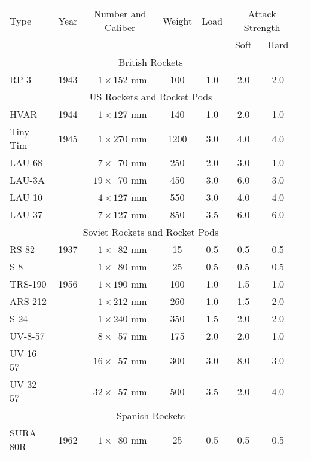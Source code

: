 \begin{twocolumntablefloat}
\begin{twocolumntable}
\begin{tabular}{lrcccccl}
\toprule
Type&
Year&
Number and Caliber&
Weight&
Load&
\multicolumn{2}{c}{Attack Strength}\\
\cmidrule{6-7}
&&&&&Soft&Hard\\
\midrule
\multicolumn{7}{c}{British Rockets}\\
\midrule
RP-3     &1943&$\phantom{0}1 \times \phantom{}152$ mm&\phantom{0}100&1.0&2.0&2.0\\
\midrule
\multicolumn{7}{c}{US Rockets and Rocket Pods}\\
\midrule
HVAR     &1944&$\phantom{0}1 \times \phantom{}127$ mm&\phantom{0}140&1.0&2.0&1.0\\
Tiny Tim &1945&$\phantom{0}1 \times \phantom{}270$ mm&\phantom{}1200&3.0&4.0&4.0\\
LAU-68   &    &$\phantom{0}7 \times \phantom{0}70$ mm&\phantom{0}250&2.0&3.0&1.0\\
LAU-3A   &    &$\phantom{}19 \times \phantom{0}70$ mm&\phantom{0}450&3.0&6.0&3.0\\
LAU-10   &    &$\phantom{0}4 \times \phantom{}127$ mm&\phantom{0}550&3.0&4.0&4.0\\
LAU-37   &    &$\phantom{0}7 \times \phantom{}127$ mm&\phantom{0}850&3.5&6.0&6.0\\
\midrule
\multicolumn{7}{c}{Soviet Rockets and Rocket Pods}\\
\midrule
RS-82    &1937&$\phantom{0}1 \times \phantom{0}82$ mm&\phantom{00}15&0.5&0.5&0.5\\
S-8      &    &$\phantom{0}1 \times \phantom{0}80$ mm&\phantom{00}25&0.5&0.5&0.5\\
TRS-190  &1956&$\phantom{0}1 \times \phantom{}190$ mm&\phantom{0}100&1.0&1.5&1.0\\
ARS-212  &    &$\phantom{0}1 \times \phantom{}212$ mm&\phantom{0}260&1.0&1.5&2.0\\
S-24     &    &$\phantom{0}1 \times \phantom{}240$ mm&\phantom{0}350&1.5&2.0&2.0\\
UV-8-57  &    &$\phantom{0}8 \times \phantom{0}57$ mm&\phantom{0}175&2.0&2.0&1.0\\
UV-16-57 &    &$\phantom{}16 \times \phantom{0}57$ mm&\phantom{0}300&3.0&8.0&3.0\\
UV-32-57 &    &$\phantom{}32 \times \phantom{0}57$ mm&\phantom{0}500&3.5&2.0&4.0\\
\midrule
\multicolumn{7}{c}{Spanish Rockets}\\
\midrule
SURA 80R &1962&$\phantom{0}1 \times \phantom{0}80$ mm&\phantom{00}25&0.5&0.5&0.5\\
\bottomrule
\end{tabular}
\end{twocolumntable}
\end{twocolumntablefloat}